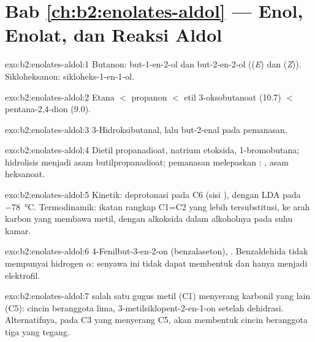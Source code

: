 \section*{Bab \ref{ch:b2:enolates-aldol} --- Enol, Enolat, dan Reaksi Aldol}

\begin{solution}{exo:b2:enolates-aldol:1}
Butanon: but-1-en-2-ol  dan but-2-en-2-ol  ((\textit{E}) dan
(\textit{Z})). Sikloheksanon: sikloheks-1-en-1-ol.
\end{solution}

\begin{solution}{exo:b2:enolates-aldol:2}
Etana $<$ propanon $<$ etil 3-oksobutanoat (10.7) $<$ pentana-2,4-dion (9.0).
\end{solution}

\begin{solution}{exo:b2:enolates-aldol:3}
3-Hidroksibutanal, lalu but-2-enal pada pemanasan.
\end{solution}

\begin{solution}{exo:b2:enolates-aldol:4}
Dietil propanadioat, natrium etoksida, 1-bromobutana; hidrolisis menjadi
asam butilpropanadioat; pemanasan melepaskan :
, asam heksanoat.
\end{solution}

\begin{solution}{exo:b2:enolates-aldol:5}
Kinetik: deprotonasi pada C6 (sisi ), dengan LDA pada \qty{-78}{\degreeCelsius}. Termodinamik:
ikatan rangkap C1=C2 yang lebih tersubstitusi, ke arah karbon yang membawa
metil, dengan alkoksida dalam alkoholnya pada suhu kamar.
\end{solution}

\begin{solution}{exo:b2:enolates-aldol:6}
4-Fenilbut-3-en-2-on (benzalaseton), . Benzaldehida tidak
mempunyai hidrogen $\alpha$: senyawa ini tidak dapat membentuk  dan
hanya menjadi elektrofil.
\end{solution}

\begin{solution}{exo:b2:enolates-aldol:7}
 salah satu gugus metil (C1) menyerang karbonil yang lain (C5): cincin
beranggota lima, 3-metilsiklopent-2-en-1-on setelah dehidrasi. Alternatifnya,
 pada C3 yang menyerang C5, akan membentuk cincin beranggota tiga yang
tegang.
\end{solution}

